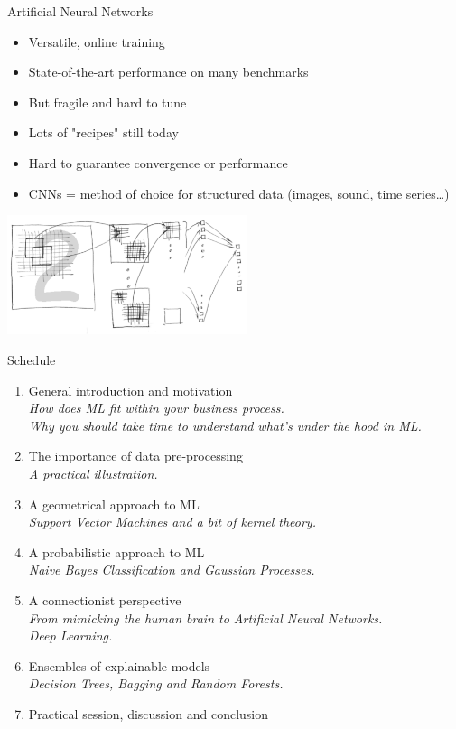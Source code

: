 \documentclass{beamer}
\begin{document}
\begin{frame}{Artificial Neural Networks}
\begin{itemize}
\item Versatile, online training
\item State-of-the-art performance on many benchmarks
\item But fragile and hard to tune
\item Lots of "recipes" still today
\item Hard to guarantee convergence or performance
\item CNNs = method of choice for structured data (images, sound, time series\ldots)
\end{itemize}
\begin{center}
\includegraphics[width=7cm]{img/IllustrationNeuralNet.pdf}
\end{center}
\end{frame}

\begin{frame}{Schedule}
\begin{enumerate}
\item General introduction and motivation \Checkmark \\
{\small \it How does ML fit within your business process.\\
Why you should take time to understand what's under the hood in ML.}
\item The importance of data pre-processing \Checkmark \\
{\small \it A practical illustration.}
\item A geometrical approach to ML \Checkmark \\
{\small \it Support Vector Machines and a bit of kernel theory.}
\item A probabilistic approach to ML \Checkmark \\
{\small \it Naive Bayes Classification and Gaussian Processes.}
\item A connectionist perspective \Checkmark \\
{\small \it From mimicking the human brain to Artificial Neural Networks.\\
Deep Learning.}
\item Ensembles of explainable models\\
{\small \it Decision Trees, Bagging and Random Forests.}
\item Practical session, discussion and conclusion
\end{enumerate}
\end{frame}
\end{document}
